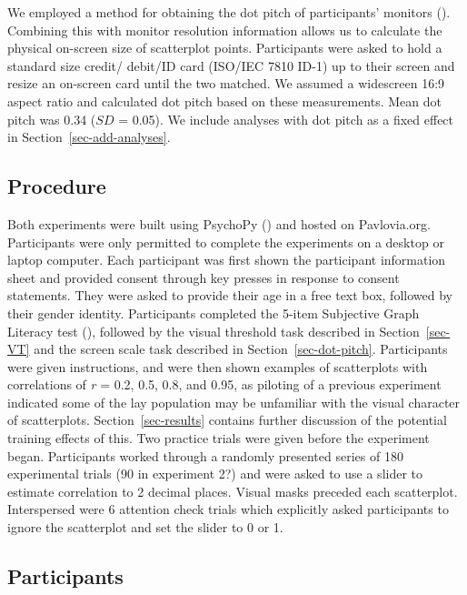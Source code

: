 \documentclass[manuscript, review, anonymous, screen]{acmart}
\begin{document}
We employed a method for obtaining the dot pitch of participants'
monitors (\citet{screenscale}). Combining this with monitor resolution
information allows us to calculate the physical on-screen size of
scatterplot points. Participants were asked to hold a standard size
credit/ debit/ID card (ISO/IEC 7810 ID-1) up to their screen and resize
an on-screen card until the two matched. We assumed a widescreen 16:9
aspect ratio and calculated dot pitch based on these measurements. Mean
dot pitch was 0.34 (\(SD\) = 0.05). We include analyses with dot pitch
as a fixed effect in Section~\ref{sec-add-analyses}.

\hypertarget{sec-gen-procedure}{%
\subsection{Procedure}\label{sec-gen-procedure}}

Both experiments were built using PsychoPy (\citet{pierce_2019}) and
hosted on Pavlovia.org. Participants were only permitted to complete the
experiments on a desktop or laptop computer. Each participant was first
shown the participant information sheet and provided consent through key
presses in response to consent statements. They were asked to provide
their age in a free text box, followed by their gender identity.
Participants completed the 5-item Subjective Graph Literacy test
(\citet{garcia_2016}), followed by the visual threshold task described
in Section~\ref{sec-VT} and the screen scale task described in
Section~\ref{sec-dot-pitch}. Participants were given instructions, and
were then shown examples of scatterplots with correlations of \emph{r} =
0.2, 0.5, 0.8, and 0.95, as piloting of a previous experiment indicated
some of the lay population may be unfamiliar with the visual character
of scatterplots. Section~\ref{sec-results} contains further discussion
of the potential training effects of this. Two practice trials were
given before the experiment began. Participants worked through a
randomly presented series of 180 experimental trials (90 in experiment
2?) and were asked to use a slider to estimate correlation to 2 decimal
places. Visual masks preceded each scatterplot. Interspersed were 6
attention check trials which explicitly asked participants to ignore the
scatterplot and set the slider to 0 or 1.

\hypertarget{sec-participants}{%
\subsection{Participants}\label{sec-participants}}
\end{document}
